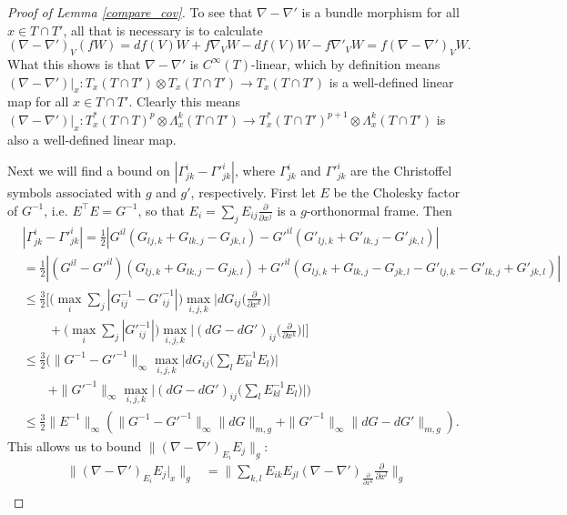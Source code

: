 \documentclass[11pt]{article}
\newcommand{\pdiff}[2]{\frac{\partial #1}{\partial #2}}
\begin{document}
\begin{proof}[Proof of Lemma \ref{compare_cov}]
To see that $\nabla - \nabla'$ is a bundle morphism for all $x \in T \cap T'$, all that is necessary is to calculate 
\[
(\nabla - \nabla')_V(fW) = df(V)W + f\nabla_V W - df(V)W - f\nabla'_VW = f(\nabla - \nabla')_VW.
\]
What this shows is that $\nabla - \nabla'$ is $C^\infty(T)$-linear, which by definition means $(\nabla - \nabla')|_x: T_x(T \cap T') \otimes T_x(T \cap T') \to T_x(T \cap T')$ is a well-defined linear map for all $x \in T \cap T'$. Clearly this means $(\nabla - \nabla')|_x: T_x^*(T \cap T)^p \otimes \Lambda^k_x(T \cap T') \to T^*_x(T \cap T')^{p+1} \otimes \Lambda^k_x(T \cap T')$ is also a well-defined linear map.

Next we will find a bound on $|\Gamma^i_{jk} - \Gamma'^i_{jk}|$, where $\Gamma^i_{jk}$ and $\Gamma'^i_{jk}$ are the Christoffel symbols associated with $g$ and $g'$, respectively. First let $E$ be the Cholesky factor of $G^{-1}$, i.e. $E^{\intercal}E = G^{-1}$, so that $E_i = \sum_j E_{ij} \pdiff{}{x^j}$ is a $g$-orthonormal frame. Then
\begin{align*}
&|\Gamma^i_{jk} - \Gamma'^i_{jk}| = \frac{1}{2}|G^{il}(G_{lj,k} + G_{lk,j} - G_{jk,l}) - G'^{il}(G'_{lj,k} + G'_{lk,j} - G'_{jk,l})|\\
&= \frac{1}{2}|(G^{il} - G'^{il})(G_{lj,k} + G_{lk,j} - G_{jk,l}) + G'^{il}(G_{lj,k} + G_{lk,j} - G_{jk,l} - G'_{lj,k} - G'_{lk,j} + G'_{jk,l})|\\
&\le \frac{3}{2}\Bigg[\bigg(\max_{i}\sum_{j}|G^{-1}_{ij} - G'^{-1}_{ij}|\bigg)\max_{i,j,k}\bigg|dG_{ij}\bigg(\pdiff{}{x^k}\bigg)\bigg| \\
&\quad\quad + \bigg(\max_{i}\sum_j|G'^{-1}_{ij}|\bigg)\max_{i,j,k}\bigg|(dG - dG')_{ij}\bigg(\pdiff{}{x^k}\bigg)\bigg|\Bigg]\\
&\le \frac{3}{2}\Bigg(\|G^{-1} - G'^{-1}\|_\infty\max_{i,j,k}\bigg|dG_{ij}\bigg(\sum_lE^{-1}_{kl}E_l\bigg)\bigg| \\
&\quad\quad + \|G'^{-1}\|_\infty\max_{i,j,k}\bigg|(dG - dG')_{ij}\bigg(\sum_lE^{-1}_{kl}E_l\bigg)\bigg|\Bigg)\\
&\le \frac{3}{2}\|E^{-1}\|_\infty(\|G^{-1} - G'^{-1}\|_\infty\|dG\|_{m,g} + \|G'^{-1}\|_\infty\|dG - dG'\|_{m,g}).
\end{align*}
This allows us to bound $\|(\nabla - \nabla')_{E_i}E_j\|_g$:
\begin{align*}
\|(\nabla - \nabla')_{E_i}E_j|_x\|_g &= \bigg\|\sum_{k,l}E_{ik}E_{jl}(\nabla - \nabla')_\pdiff{}{x^k}\pdiff{}{x^l}\bigg\|_g \\

\end{align*}
\end{proof}
\end{document}
